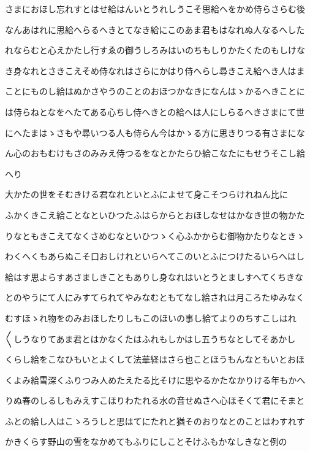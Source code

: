 \documentclass[a4paper,11pt,landscape]{ltjtarticle}
\begin{document}
\par\medskip
さまにおほし忘れすとはせ給はんいとうれしうこそ思給へをかめ侍らさらむ後
\par\medskip
なんあはれに思給へらるへきとてなき給にこのあま君もはなれぬ人なるへした
\par\medskip
れならむと心えかたし行すゑの御うしろみはいのちもしりかたくたのもしけな
\par\medskip
き身なれとさきこえそめ侍なれはさらにかはり侍へらし尋きこえ給へき人はま
\par\medskip
ことにものし給はぬかさやうのことのおほつかなきになんはゝかるへきことに
\par\medskip
は侍らねとなをへたてある心ちし侍へきとの給へは人にしらるへきさまにて世
\par\medskip
にへたまはゝさもや尋いつる人も侍らん今はかゝる方に思きりつる有さまにな
\par\medskip
ん心のおもむけもさのみみえ侍つるをなとかたらひ給こなたにもせうそこし給
\par\medskip
へり
\par\medskip
大かたの世をそむきける君なれといとふによせて身こそつらけれねん比に
\par\medskip
ふかくきこえ給ことなといひつたふはらからとおほしなせはかなき世の物かた
\par\medskip
りなともきこえてなくさめむなといひつゝく心ふかからむ御物かたりなときゝ
\par\medskip
わくへくもあらぬこそ口おしけれといらへてこのいとふにつけたるいらへはし
\par\medskip
給はす思よらすあさましきこともありし身なれはいとうとましすへてくちきな
\par\medskip
とのやうにて人にみすてられてやみなむともてなし給されは月ころたゆみなく
\par\medskip
むすほゝれ物をのみおほしたりしもこのほいの事し給てよりのちすこしはれ
\par\medskip
〱しうなりてあま君とはかなくたはふれもしかはし五うちなとしてそあかし
\par\medskip
くらし給をこなひもいとよくして法華経はさら也ことほうもんなともいとおほ
\par\medskip
くよみ給雪深くふりつみ人めたえたる比そけに思やるかたなかりける年もかへ
\par\medskip
りぬ春のしるしもみえすこほりわたれる水の音せぬさへ心ほそくて君にそまと
\par\medskip
ふとの給し人はこゝろうしと思はてにたれと猶そのおりなとのことはわすれす
\par\medskip
かきくらす野山の雪をなかめてもふりにしことそけふもかなしきなと例の
\end{document}
